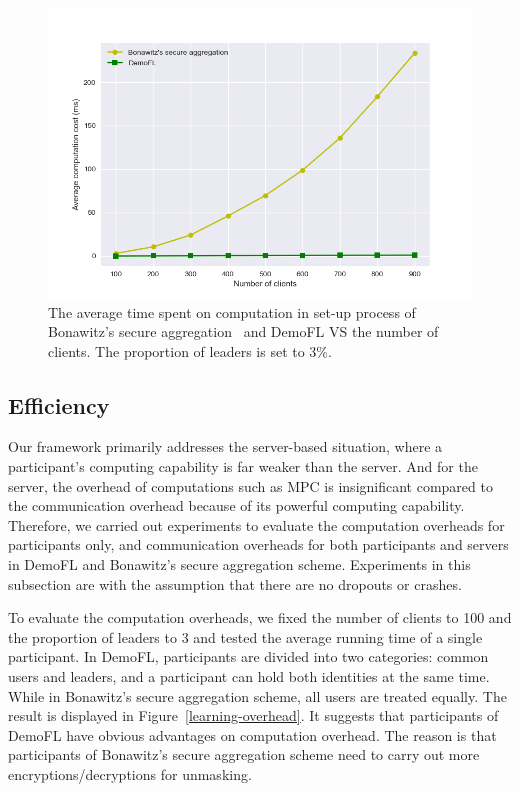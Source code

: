 \begin{figure}[!ht]
    \centering
    \includegraphics[width=\columnwidth]{img/avg-user-cpu.png}
    \caption{The average time spent on computation in set-up process of Bonawitz's secure aggregation~\cite{Practical} and DemoFL VS the number of clients. The proportion of leaders is set to $3\%$.}
    \label{avg-user-cpu}
\end{figure}

\subsection{Efficiency}
Our framework primarily addresses the server-based situation, where a participant's computing capability is far weaker than the server. And for the server, the overhead of computations such as MPC is insignificant compared to the communication overhead because of its powerful computing capability. Therefore, we carried out experiments to evaluate the computation overheads for participants only, and communication overheads for both participants and servers in DemoFL and Bonawitz's secure aggregation scheme. Experiments in this subsection are with the assumption that there are no dropouts or crashes.

To evaluate the computation overheads, we fixed the number of clients to 100 and the proportion of leaders to $3$ and tested the average running time of a single participant. In DemoFL, participants are divided into two categories: common users and leaders, and a participant can hold both identities at the same time. While in Bonawitz's secure aggregation scheme, all users are treated equally. The result is displayed in Figure~\ref{learning-overhead}. It suggests that participants of DemoFL have obvious advantages on computation overhead. The reason is that participants of Bonawitz's secure aggregation scheme need to carry out more encryptions/decryptions for unmasking.

